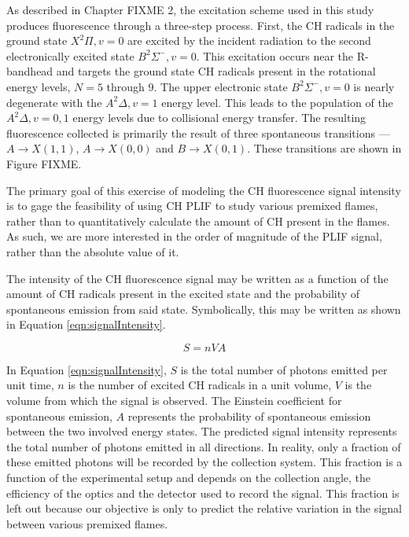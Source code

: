 As described in Chapter FIXME 2, the excitation scheme used in this study produces fluorescence through a three-step process.
First, the CH radicals in the ground state \(X^2\Pi, v=0\) are excited by the incident radiation to the second electronically excited state \(B^2\Sigma^-, v=0\).
This excitation occurs near the R-bandhead and targets the ground state CH radicals present in the rotational energy levels, \(N=5\) through 9.
The upper electronic state \(B^2\Sigma^-, v=0\) is nearly degenerate with the \(A^2\Delta, v=1\) energy level.
This leads to the population of the \(A^2\Delta, v=0,1\) energy levels due to collisional energy transfer.
The resulting fluorescence collected is primarily the result of three spontaneous transitions --- \(A\rightarrow X(1,1)\), \(A\rightarrow X(0,0)\) and \(B\rightarrow X(0,1)\).
These transitions are shown in Figure FIXME.

The primary goal of this exercise of modeling the CH fluorescence signal intensity is to gage the feasibility of using CH PLIF to study various premixed flames, rather than to quantitatively calculate the amount of CH present in the flames.
As such, we are more interested in the order of magnitude of the PLIF signal, rather than the absolute value of it.

The intensity of the CH fluorescence signal may be written as a function of the amount of CH radicals present in the excited state and the probability of spontaneous emission from said state.
Symbolically, this may be written as shown in Equation \ref{eqn:signalIntensity}.

\begin{equation}
S=nVA
\label{eqn:signalIntensity}
\end{equation}

In Equation \ref{eqn:signalIntensity}, \(S\) is the total number of photons emitted per unit time, \(n\) is the number of excited CH radicals in a unit volume, \(V\) is the volume from which the signal is observed.
The Einstein coefficient for spontaneous emission, \(A\) represents the probability of spontaneous emission between the two involved energy states.
The predicted signal intensity represents the total number of photons emitted in all directions.
In reality, only a fraction of these emitted photons will be recorded by the collection system.
This fraction is a function of the experimental setup and depends on the collection angle, the efficiency of the optics and the detector used to record the signal.
This fraction is left out because our objective is only to predict the relative variation in the signal between various premixed flames.

